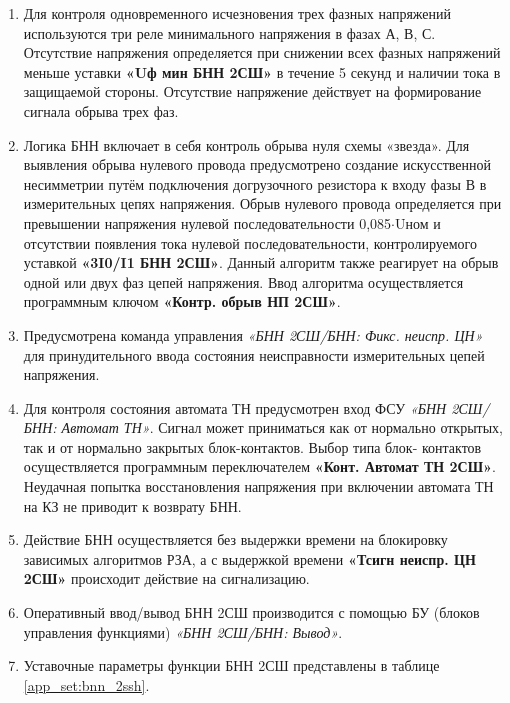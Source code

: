 \begin{enumerate}
\item
Для контроля одновременного исчезновения трех фазных напряжений используются три реле
минимального напряжения в фазах А, В, С. Отсутствие напряжения определяется при снижении всех фазных
напряжений меньше уставки \textbf{«Uф мин БНН 2СШ»} в течение 5 секунд и наличии тока в защищаемой стороны.
Отсутствие напряжение действует на формирование сигнала обрыва трех фаз.

\item
Логика БНН включает в себя контроль обрыва нуля схемы «звезда». Для выявления обрыва нулевого
провода предусмотрено создание искусственной несимметрии путём подключения догрузочного резистора к
входу фазы В в измерительных цепях напряжения. Обрыв нулевого провода определяется при превышении
напряжения нулевой последовательности 0,085$\cdot$Uном и отсутствии появления тока нулевой
последовательности, контролируемого уставкой \textbf{«3I0/I1 БНН 2СШ»}. Данный алгоритм также реагирует на обрыв
одной или двух фаз цепей напряжения. Ввод алгоритма осуществляется программным ключом
\textbf{«Контр. обрыв НП 2СШ»}.

\item 
Предусмотрена команда управления \textit{«БНН 2СШ/БНН: Фикс. неиспр. ЦН»} для принудительного ввода состояния неисправности измерительных цепей напряжения.

\item
Для контроля состояния автомата ТН предусмотрен вход ФСУ \textit{«БНН 2СШ/БНН: Автомат ТН»}. Сигнал может
приниматься как от нормально открытых, так и от нормально закрытых блок-контактов. Выбор типа блок-
контактов осуществляется программным переключателем \textbf{«Конт. Автомат ТН 2СШ»}. Неудачная попытка
восстановления напряжения при включении автомата ТН на КЗ не приводит к возврату БНН.

\item
Действие БНН осуществляется без выдержки времени на блокировку зависимых алгоритмов РЗА, а с
выдержкой времени \textbf{«Тсигн неиспр. ЦН 2СШ»} происходит действие на сигнализацию.

\item
Оперативный ввод/вывод БНН 2СШ производится с помощью БУ (блоков управления функциями) \textit{«БНН 2СШ/БНН: Вывод»}.

\item
Уставочные параметры функции БНН 2СШ представлены в таблице \ref{app_set:bnn_2ssh}.

\end{enumerate}